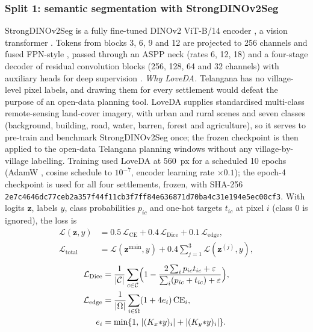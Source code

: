 \documentclass[10pt,a4paper,twocolumn]{article}
\newcommand{\dinoseg}{StrongDINOv2Seg}
\begin{document}
\subsubsection{Split 1: semantic segmentation with StrongDINOv2Seg}\label{sec:seg}
\dinoseg{} is a fully fine-tuned DINOv2 ViT-B/14 encoder \cite{oquab2023dinov2}, a vision transformer \cite{dosovitskiy2021vit}. Tokens from blocks 3, 6, 9 and 12 are projected to 256 channels and fused FPN-style \cite{lin2017fpn}, passed through an ASPP neck (rates 6, 12, 18) \cite{chen2018deeplabv3plus} and a four-stage decoder of residual convolution blocks \cite{he2016resnet} (256, 128, 64 and 32 channels) with auxiliary heads for deep supervision \cite{lee2015dsn}. \emph{Why LoveDA.} Telangana has no village-level pixel labels, and drawing them for every settlement would defeat the purpose of an open-data planning tool. LoveDA \cite{wang2021loveda} supplies standardised multi-class remote-sensing land-cover imagery, with urban and rural scenes and seven classes (background, building, road, water, barren, forest and agriculture), so it serves to pre-train and benchmark \dinoseg{} once; the frozen checkpoint is then applied to the open-data Telangana planning windows without any village-by-village labelling. Training used LoveDA at 560~px for a scheduled 10 epochs (AdamW \cite{loshchilov2019adamw}, cosine schedule \cite{loshchilov2017sgdr} to $10^{-7}$, encoder learning rate $\times 0.1$); the epoch-4 checkpoint is used for all four settlements, frozen, with SHA-256 \texttt{2e7c4646dc77ceb2\allowbreak a357f44f11cb3f7f\allowbreak f84e636871d70ba4\allowbreak c31e194e5ec00cf3}. With logits $\mathbf z$, labels $y$, class probabilities $p_{ic}$ and one-hot targets $t_{ic}$ at pixel $i$ (class 0 is ignored), the loss is
\begin{equation}
\begin{aligned}
\mathcal L(\mathbf z,y)&=0.5\,\mathcal L_{\mathrm{CE}}+0.4\,\mathcal L_{\mathrm{Dice}}+0.1\,\mathcal L_{\mathrm{edge}},\\
\mathcal L_{\mathrm{total}}&=\mathcal L(\mathbf z^{\mathrm{main}},y)+0.4\sum_{j=1}^{3}\mathcal L(\mathbf z^{(j)},y),
\end{aligned}
\label{eq:loss}
\end{equation}
\begin{equation}
\begin{aligned}
\mathcal L_{\mathrm{Dice}}&=\frac1{|\mathcal C|}\sum_{c\in\mathcal C}\Bigl(1-\frac{2\sum_i p_{ic}t_{ic}+\varepsilon}{\sum_i (p_{ic}+t_{ic})+\varepsilon}\Bigr),\\
\mathcal L_{\mathrm{edge}}&=\frac1{|\Omega|}\sum_{i\in\Omega}(1+4e_i)\,\mathrm{CE}_i,\\
e_i&=\min\{1,\,|(K_x{*}y)_i|+|(K_y{*}y)_i|\}.
\end{aligned}
\label{eq:diceedge}
\end{equation}
\end{document}
